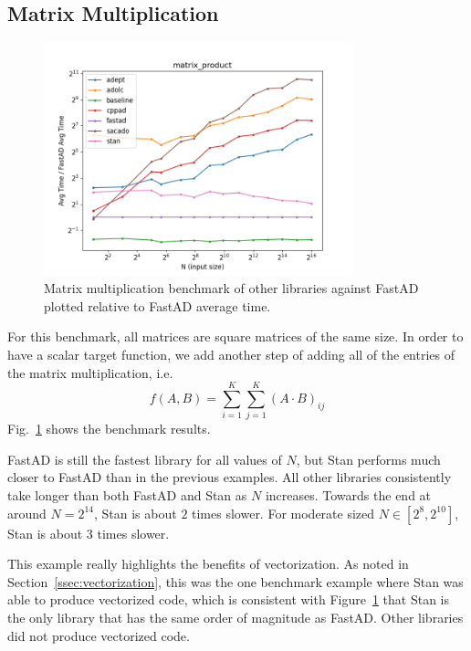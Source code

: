\subsection{Matrix Multiplication}\label{ssec:matrix_mult}

\begin{figure}[t]
    \centering
    \includegraphics[width=0.8\textwidth]{figs/matrix_product_fig.png}
    \caption{%
        Matrix multiplication benchmark of other libraries against FastAD 
        plotted relative to FastAD average time.
    }\label{fig:matrix_mult}
\end{figure}

For this benchmark, all matrices are square matrices of the same size.
In order to have a scalar target function,
we add another step of adding all of the entries of the matrix multiplication, i.e.
\[
    f(A, B) = \sum\limits_{i=1}^{K} \sum\limits_{j=1}^{K} {(A \cdot B)}_{ij}
\]
Fig.~\ref{fig:matrix_mult} shows the benchmark results.

FastAD is still the fastest library for all values of $N$, 
but Stan performs much closer to FastAD than in the previous examples.
All other libraries consistently take longer than both FastAD and Stan as $N$ increases.
Towards the end at around $N=2^{14}$, 
Stan is about $ 2$ times slower.
For moderate sized $N \in [2^{8}, 2^{10}]$, Stan is about $ 3$ times slower.

This example really highlights the benefits of vectorization.
As noted in Section~\ref{ssec:vectorization},
this was the one benchmark example where Stan was able to produce vectorized code,
which is consistent with Figure~\ref{fig:matrix_mult} 
that Stan is the only library that has the same 
order of magnitude as FastAD.
Other libraries did not produce vectorized code.

